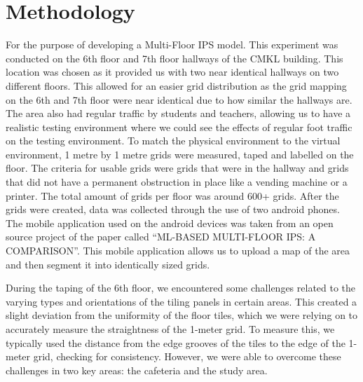 \documentclass[conference]{IEEEtran}
\begin{document}
	\section{Methodology}
	For the purpose of developing a Multi-Floor IPS model. This experiment was conducted on the 6th floor and 7th floor hallways of the CMKL building. This location was chosen as it provided us with two near identical hallways on two different floors. This allowed for an easier grid distribution as the grid mapping on the 6th and 7th floor were near identical due to how similar the hallways are. The area also had regular traffic by students and teachers, allowing us to have a realistic testing environment where we could see the effects of regular foot traffic on the testing environment. To match the physical environment to the virtual environment, 1 metre by 1 metre grids were measured, taped and labelled on the floor. The criteria for usable grids were grids that were in the hallway and grids that did not have a permanent obstruction in place like a vending machine or a printer. The total amount of grids per floor was around 600+ grids. After the grids were created, data was collected through the use of two android phones. The mobile application used on the android devices was taken from an open source project of the paper called “ML-BASED MULTI-FLOOR IPS: A COMPARISON”\cite{bgp4}. This mobile application allows us to upload a map of the area and then segment it into identically sized grids.
	
	
	During the taping of the 6th floor, we encountered some challenges related to the varying types and orientations of the tiling panels in certain areas. This created a slight deviation from the uniformity of the floor tiles, which we were relying on to accurately measure the straightness of the 1-meter grid. To measure this, we typically used the distance from the edge grooves of the tiles to the edge of the 1-meter grid, checking for consistency. However, we were able to overcome these challenges in two key areas: the cafeteria and the study area.
	

		
\end{document}
